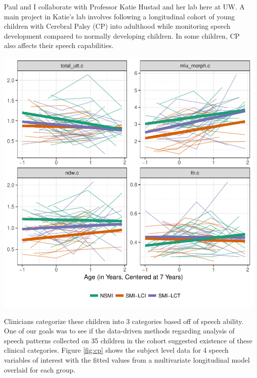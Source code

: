 \documentclass[11pt]{article}
\begin{document}
\begin{multicols}{2}
Paul and I collaborate with Professor Katie Hustad and her lab here at UW. A main project in Katie's lab involves following a longitudinal cohort of young children with Cerebral Palsy (CP) into adulthood while monitoring speech development compared to normally developing children. In some children, CP also affects their speech capabilities. 
\begin{center}\vspace{0cm}
\includegraphics[width=1\linewidth]{fitted_plots_for_speech_analysis_speech_for_handout.pdf}
\label{fig:cp}
\end{center}\vspace{0cm}
\hspace{.5cm}Clinicians categorize these children into 3 categories based off of speech ability. One of our goals was to see if the data-driven methods regarding analysis of speech patterns collected on 35 children in the cohort suggested existence of these clinical categories.  Figure \ref{fig:cp} shows the subject level data for 4 speech variables of interest with the fitted values from a multivariate longitudinal model overlaid for each group.



\end{multicols}
\end{document}
